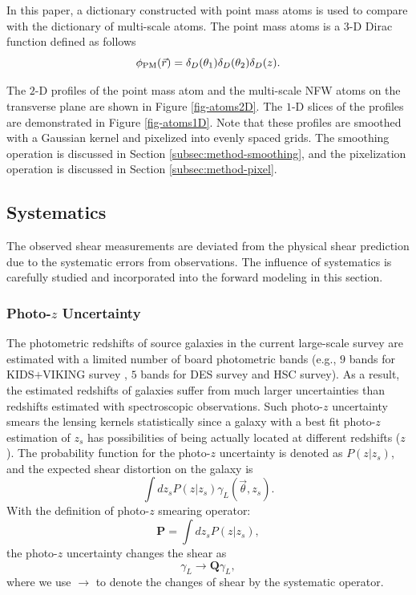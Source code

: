 \documentclass[twocolumn]{aastex62}
\begin{document}
In this paper, a dictionary constructed with point mass atoms is used to
compare with the dictionary of multi-scale atoms.  The point mass atoms is a
$3$-D Dirac function defined as follows
\begin{equation}
\phi_{\rm{PM}}(\vec{r})= \delta_D(\theta_1) \delta_D(\theta_2) \delta_D(z).
\end{equation}

The $2$-D profiles of the point mass atom and the multi-scale NFW atoms on the
transverse plane are shown in Figure \ref{fig-atoms2D}. The $1$-D slices of the
profiles are demonstrated in Figure \ref{fig-atoms1D}. Note that these profiles
are smoothed with a Gaussian kernel and pixelized into evenly spaced grids. The
smoothing operation is discussed in Section \ref{subsec:method-smoothing}, and
the pixelization operation is discussed in Section \ref{subsec:method-pixel}.

\subsection{Systematics}
\label{subsec:method-Systematics}

The observed shear measurements are deviated from the physical shear prediction
due to the systematic errors from observations. The influence of systematics is
carefully studied and incorporated into the forward modeling in this section.

\subsubsection{Photo-$z$ Uncertainty}
\label{subsec:method-photoz}

The photometric redshifts of source galaxies in the current large-scale survey
are estimated with a limited number of board photometric bands (e.g., $9$ bands
for KIDS$+$VIKING survey \citep{KIDS_VIKING-Hildebrant2020}, $5$ bands for DES
survey and HSC survey). As a result, the estimated redshifts of galaxies suffer
from much larger uncertainties than redshifts estimated with spectroscopic
observations. Such photo-$z$ uncertainty smears the lensing kernels
statistically since a galaxy with a best fit photo-$z$ estimation of $z_s$ has
possibilities of being actually located at different redshifts ($z$).  The
probability function for the photo-$z$ uncertainty is denoted as $P(z|z_s)$,
and the expected shear distortion on the galaxy is
\begin{equation}\label{eq-delta2gamma-poz}
\int dz_s P(z|z_s) \gamma_L(\vec{\theta},z_s).
\end{equation}
With the definition of photo-$z$ smearing operator:
\begin{equation}
\mathbf{P} = \int dz_s P(z|z_s),
\end{equation}
the photo-$z$ uncertainty changes the shear as
\begin{equation}
\gamma_L \rightarrow \mathbf{Q} \gamma_L,
\end{equation}
where we use $\rightarrow$ to denote the changes of shear by the systematic
operator.
\end{document}
